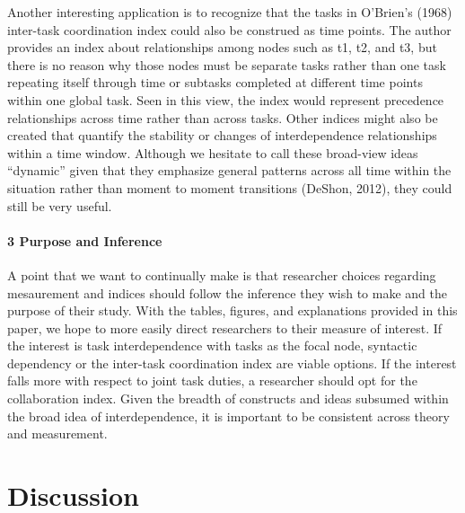 \documentclass[english,,man]{apa6}
\let\oldparagraph\paragraph
\renewcommand{\paragraph}[1]{\oldparagraph{#1}\mbox{}}
\theoremstyle{definition}
\theoremstyle{definition}
\theoremstyle{definition}
\theoremstyle{remark}
\begin{document}
Another interesting application is to recognize that the tasks in
O'Brien's (1968) inter-task coordination index could also be construed
as time points. The author provides an index about relationships among
nodes such as t1, t2, and t3, but there is no reason why those nodes
must be separate tasks rather than one task repeating itself through
time or subtasks completed at different time points within one global
task. Seen in this view, the index would represent precedence
relationships across time rather than across tasks. Other indices might
also be created that quantify the stability or changes of
interdependence relationships within a time window. Although we hesitate
to call these broad-view ideas \enquote{dynamic} given that they
emphasize general patterns across all time within the situation rather
than moment to moment transitions (DeShon, 2012), they could still be
very useful.

\hypertarget{purpose-and-inference-1}{%
\paragraph{3 Purpose and Inference}\label{purpose-and-inference-1}}

A point that we want to continually make is that researcher choices
regarding mesaurement and indices should follow the inference they wish
to make and the purpose of their study. With the tables, figures, and
explanations provided in this paper, we hope to more easily direct
researchers to their measure of interest. If the interest is task
interdependence with tasks as the focal node, syntactic dependency or
the inter-task coordination index are viable options. If the interest
falls more with respect to joint task duties, a researcher should opt
for the collaboration index. Given the breadth of constructs and ideas
subsumed within the broad idea of interdependence, it is important to be
consistent across theory and measurement.

\hypertarget{discussion}{%
\section{Discussion}\label{discussion}}
\end{document}
